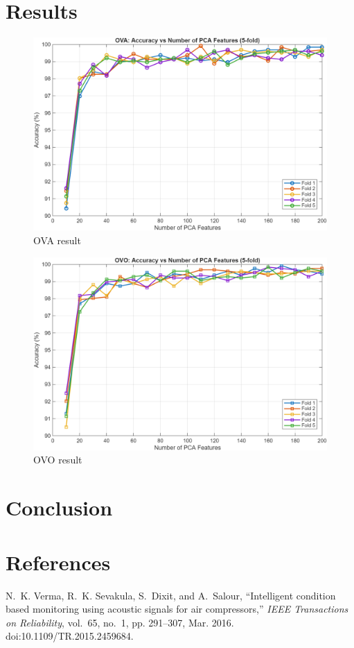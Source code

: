 \documentclass[12pt,a4paper]{article}
\begin{document}
\begin{multicols}{2}
\section{Results}
\label{sec:results}
\begin{figure}[H]
    \centering
    \includegraphics[width=1\linewidth]{Diagrams/res1.png}
    \caption{OVA result}
    \label{fig:ova}
\end{figure}
\begin{figure}[H]
    \centering
    \includegraphics[width=1\linewidth]{Diagrams/res2.png}
    \caption{OVO result}
    \label{fig:ovo}
\end{figure}
\section{Conclusion}
\label{sec:conclusion}
\section*{References}
\begin{thebibliography}{1}
N.~K. Verma, R.~K. Sevakula, S.~Dixit, and A.~Salour, ``Intelligent condition based monitoring using acoustic signals for air compressors,'' \emph{IEEE Transactions on Reliability}, vol.~65, no.~1, pp. 291--307, Mar. 2016. doi:10.1109/TR.2015.2459684.
\end{thebibliography}
\end{multicols}
\end{document}

